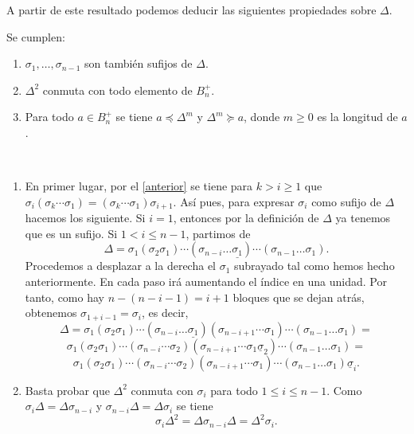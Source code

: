 \documentclass[bibtex, anon]{TEMat-article}
\begin{document}
A partir de este resultado podemos deducir las siguientes propiedades sobre $\Delta$.


\begin{proposicion}\label{sufijos} Se cumplen:
	\begin{enumerate}
		\item $\sigma_1,\dots,\sigma_{n-1}$ son también sufijos de $\Delta$.
		\item $\Delta^2$ conmuta con todo elemento de $B_n^+$.
		\item Para todo $a\in B_n^+$ se tiene $a\preccurlyeq\Delta^m$ y $\Delta^m\succcurlyeq a$, donde  $m\geq 0$ es la longitud de $a$.
	\end{enumerate}
	
\end{proposicion}

\begin{demostracion}\
	\begin{enumerate}
		\item En primer lugar, por el \cref{anterior} se tiene para $k>i\geq 1$ que $\sigma_i(\sigma_k\cdots\sigma_1)=(\sigma_k\cdots\sigma_1)\sigma_{i+1}$. 
		Así pues, para expresar $\sigma_i$ como sufijo de $\Delta$ hacemos los siguiente. Si $i=1$, entonces por la definición de $\Delta$ ya tenemos que es un sufijo. Si $1<i\leq n-1$, partimos de
		\[
		\Delta=\sigma_1(\sigma_2\sigma_1)\cdots(\sigma_{n-i}\dots\underline{\sigma_1})\cdots(\sigma_{n-1}\dots\sigma_1).
		\]
		Procedemos a desplazar a la derecha el $\sigma_1$ subrayado tal como hemos hecho anteriormente. En cada paso irá aumentando el índice en una unidad. Por tanto, como hay $n-(n-i-1)=i+1$ bloques que se dejan atrás, obtenemos $\sigma_{1+i-1}=\sigma_i$, es decir,
		\[
		\Delta=\sigma_1(\sigma_2\sigma_1)\cdots(\sigma_{n-i}\dots\underline{\sigma_1})(\sigma_{n-i+1}\cdots\sigma_1)\cdots(\sigma_{n-1}\dots\sigma_1)=
		\]
		\[
		\sigma_1(\sigma_2\sigma_1)\cdots(\sigma_{n-i}\cdots\sigma_2)(\sigma_{n-i+1}\cdots\sigma_1\underline{\sigma}_2)\cdots(\sigma_{n-1}\dots\sigma_1)=
		\]
		\[
		\sigma_1(\sigma_2\sigma_1)\cdots(\sigma_{n-i}\cdots\sigma_2)(\sigma_{n-i+1}\cdots\sigma_1)\cdots(\sigma_{n-1}\dots\sigma_1)\underline{\sigma}_i.
		\]
		
		
		\item Basta probar que $\Delta^2$ conmuta con $\sigma_i$ para todo $1\leq i\leq n-1$. Como $\sigma_i\Delta=\Delta\sigma_{n-i}$ y $\sigma_{n-i}\Delta=\Delta\sigma_i$ se tiene
		\[
		\sigma_i\Delta^2=\Delta\sigma_{n-i}\Delta=\Delta^2\sigma_i.
		\]
		

\end{enumerate}
\end{demostracion}
\end{document}
